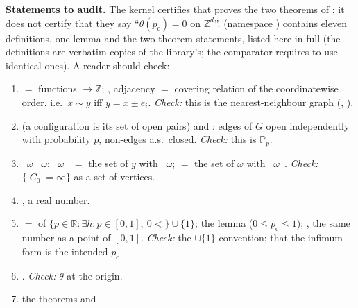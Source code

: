 \documentclass[11pt]{article}
\theoremstyle{definition}
\theoremstyle{remark}
\newcommand{\PP}{\mathbb{P}}
\newcommand{\Zd}{\mathbb{Z}^d}
\newcommand{\ZZ}{\mathbb{Z}}
\newcommand{\RR}{\mathbb{R}}
\newcommand{\pc}{p_{\mathrm c}}
\begin{document}
\begin{table}[t]
\newsavebox{\auditbox}\begin{lrbox}{\auditbox}\begin{minipage}{0.955\textwidth}\footnotesize
\textbf{Statements to audit.}  The kernel certifies that  proves the two theorems of ; it does
not certify that they say ``$\theta(\pc)=0$ on $\Zd$''.   (namespace ) contains eleven definitions, one
lemma and the two theorem statements, listed here in full (the definitions are verbatim copies of the library's; the comparator requires
 to use identical ones).  A reader should check:
\begin{enumerate}[leftmargin=1.6em,itemsep=0pt,topsep=2pt]
\item {} $=$ functions  $\to\ZZ$; , adjacency $=$ covering relation of
 the coordinatewise order, i.e.\ $x\sim y$ iff $y=x\pm e_i$.  \emph{Check:} this is the nearest-neighbour graph
 (, ).
\item {} (a configuration is its set of open pairs) and
 : edges of $G$ open independently with probability $p$, non-edges
 a.s.\ closed.  \emph{Check:} this is $\PP_p$.
\item {}\ $\omega$ \ $\omega$; \ $\omega$\  $=$ the set of $y$ with
 \ $\omega$;  $=$ the set of $\omega$ with \ $\omega$\ .
 \emph{Check:} $\{|C_0|=\infty\}$ as a set of vertices.
\item {}, a real number.
\item {} $=$  of $\{p\in\RR:\exists h\colon p\in[0,1],\ 0<{}$$\}\cup\{1\}$; the lemma
  ($0\le\pc\le1$); , the same number as a point of $[0,1]$.  \emph{Check:} the $\cup\{1\}$
 convention; that the infimum form is the intended $\pc$.
\item {}.  \emph{Check:} $\theta$ at the origin.
\item the theorems  and 

\end{enumerate}
\end{minipage}
\end{lrbox}
\end{table}
\end{document}
